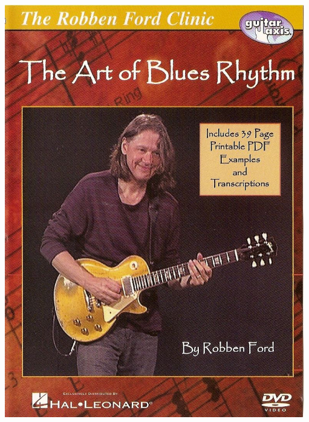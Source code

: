 \documentclass[a4paper]{book}
\begin{document}
\begin{center}
\includegraphics[width=13.106cm,height=18.052cm]{lebluessupportsmethodes-img139.jpg}
\end{center}







\clearpage
\end{document}
